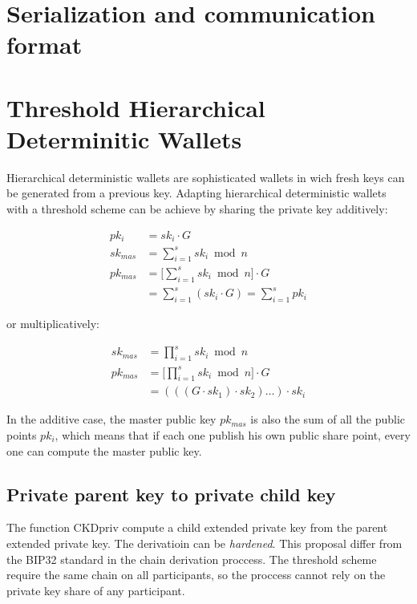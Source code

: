 \section{Serialization and communication format}



\section{Threshold Hierarchical Determinitic Wallets}

Hierarchical deterministic wallets are sophisticated wallets in wich fresh keys
can be generated from a previous key. Adapting hierarchical deterministic wallets
with a threshold scheme can be achieve by sharing the private key additively:

\begin{equation*}
\begin{split}
  pk_i     &= sk_i \cdot G \\
  sk_{mas} &= \sum_{i=1}^{s} sk_i \bmod n \\
  pk_{mas} &= \Bigg[ \sum_{i=1}^{s} sk_i \bmod n \Bigg] \cdot G \\
           &= \sum_{i=1}^{s} (sk_i \cdot G) = \sum_{i=1}^{s} pk_i
\end{split}
\end{equation*}

or multiplicatively:

\begin{equation*}
\begin{split}
  sk_{mas} &= \prod_{i=1}^{s} sk_i \bmod n \\
  pk_{mas} &= \Bigg[ \prod_{i=1}^{s} sk_i \bmod n \Bigg] \cdot G \\
           &= (((G \cdot sk_1) \cdot sk_2) \dots )\cdot sk_i
\end{split}
\end{equation*}

In the additive case, the master public key $pk_{mas}$ is also the sum of all the
public points $pk_i$, which means that if each one publish his own public share
point, every one can compute the master public key.

\subsection{Private parent key to private child key}
The function CKDpriv compute a child extended private key from the parent extended
private key. The derivatioin can be \textit{hardened}. This proposal differ from
the BIP32 standard in the chain derivation proccess. The threshold scheme require
the same chain on all participants, so the proccess cannot rely on the private key
share of any participant.

